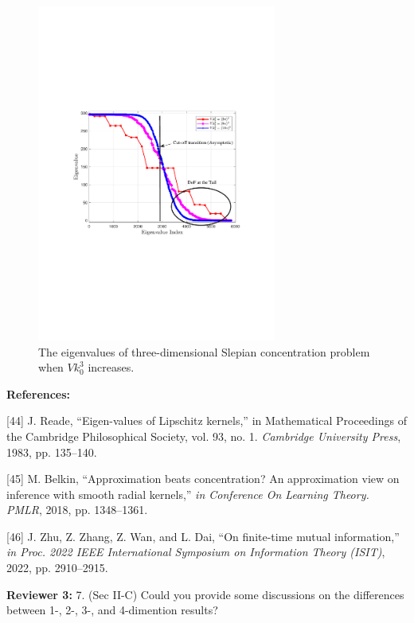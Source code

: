 \documentclass[a4paper,12pt]{article}
\begin{document}
\begin{framed}
{	   \setcounter{figure}{2}
	\begin{figure}[H]
		\centering 
		\includegraphics[width=0.7\textwidth]{figs/save_3d_different_Vk.pdf} 
		\caption{\color{red} The eigenvalues of three-dimensional Slepian concentration problem when $V k_0^3$ increases.} 
		\label{3d_Vk}
	\end{figure}
}
\end{framed}

{\color{blue}
	{\bf References:}
	
	[44] J. Reade, “Eigen-values of Lipschitz kernels,” in Mathematical Proceedings of the Cambridge Philosophical Society, vol. 93, no. 1.
	{\it Cambridge University Press}, 1983, pp. 135–140.
	
	
	[45] M. Belkin, “Approximation beats concentration? An approximation view on inference with smooth radial kernels,” {\it in Conference
		On Learning Theory. PMLR}, 2018, pp. 1348–1361.
	
	[46] J. Zhu, Z. Zhang, Z. Wan, and L. Dai, “On finite-time mutual information,” {\it in Proc. 2022 IEEE International Symposium on
		Information Theory (ISIT)}, 2022, pp. 2910–2915.
}

\textbf{Reviewer 3:}
7. (Sec II-C) Could you provide some discussions on the differences between 1-, 2-, 3-, and 4-dimention results?
\end{document}
